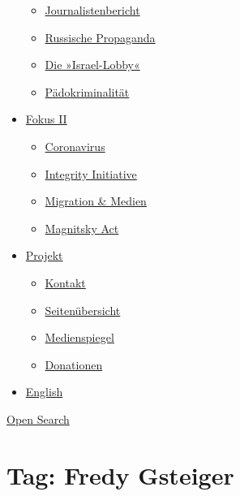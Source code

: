 \begin{itemize}
  \begin{itemize}
  \tightlist
  \item
    \href{https://swprs.org/bericht-eines-journalisten/}{Journalistenbericht}
  \item
    \href{https://swprs.org/russische-propaganda/}{Russische Propaganda}
  \item
    \href{https://swprs.org/die-israel-lobby-fakten-und-mythen/}{Die
    »Israel-Lobby«}
  \item
    \href{https://swprs.org/geopolitik-und-paedokriminalitaet/}{Pädokriminalität}
  \end{itemize}
\item
  \href{https://swprs.org/migration-und-medien/}{Fokus II}

  \begin{itemize}
  \tightlist
  \item
    \href{https://swprs.org/covid-19-hinweis-ii/}{Coronavirus}
  \item
    \href{https://swprs.org/die-integrity-initiative/}{Integrity
    Initiative}
  \item
    \href{https://swprs.org/migration-und-medien/}{Migration \& Medien}
  \item
    \href{https://swprs.org/der-fall-magnitsky/}{Magnitsky Act}
  \end{itemize}
\item
  \href{https://swprs.org/kontakt/}{Projekt}

  \begin{itemize}
  \tightlist
  \item
    \href{https://swprs.org/kontakt/}{Kontakt}
  \item
    \href{https://swprs.org/uebersicht/}{Seitenübersicht}
  \item
    \href{https://swprs.org/medienspiegel/}{Medienspiegel}
  \item
    \href{https://swprs.org/donationen/}{Donationen}
  \end{itemize}
\item
  \href{https://swprs.org/contact/}{English}
\end{itemize}

\protect\hyperlink{}{Open Search}

\hypertarget{tag-fredy-gsteiger}{%
\section{Tag: Fredy Gsteiger}\label{tag-fredy-gsteiger}}

